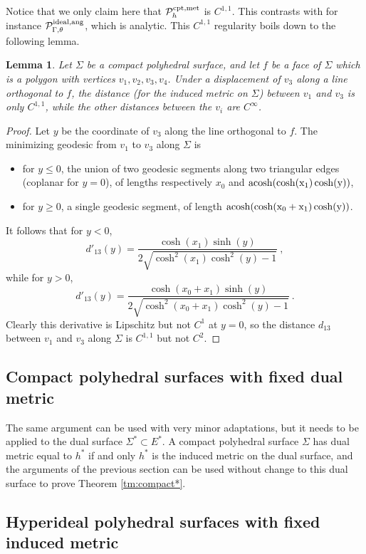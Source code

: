 \documentclass[notitlepage,twoside,a4paper]{amsart}
\newcommand{\Pidang}{\cP^{\rm ideal,ang}_{\Gamma,\theta}}
\newcommand{\Pcomet}{\cP^{\rm cpt,met}_{h}}
\newtheorem{lemma}[theorem]{\rm\bf Lemma}
\theoremstyle{named}
\newcommand{\cP}{{\mathcal P}}
\begin{document}
Notice that we only claim here that $\Pcomet$ is $C^{1,1}$. This contrasts with for instance $\Pidang$, which is analytic. This $C^{1,1}$ regularity boils down to the following lemma.

\begin{lemma} \label{lm:C11}
  Let $\Sigma$ be a compact polyhedral surface, and let $f$ be a face of $\Sigma$ which is a polygon with vertices $v_1, v_2, v_3, v_4$. Under a displacement of $v_3$ along a line orthogonal to $f$, the distance (for the induced metric on $\Sigma$) between $v_1$ and $v_3$ is only $C^{1,1}$, while the other distances between the $v_i$ are $C^{\infty}$.
\end{lemma}

\begin{proof}
  Let $y$ be the coordinate of $v_3$ along the line orthogonal to $f$. The minimizing geodesic from $v_1$ to $v_3$ along $\Sigma$ is
  \begin{itemize}
  \item for $y\leq 0$, the union of two geodesic segments along two triangular edges (coplanar for $y=0$), of lengths respectively $x_0$ and $\rm{acosh}(\cosh(x_1)\cosh(y))$,
  \item for $y\geq 0$, a single geodesic segment, of length $\rm{acosh}(\cosh(x_0+x_1)\cosh(y))$.
  \end{itemize}
  It follows that for $y<0$,
  $$ d'_{13}(y) = \frac{\cosh(x_1)\sinh(y)}{2\sqrt{\cosh^2(x_1)\cosh^2(y)-1}}~, $$
  while for $y>0$,
  $$ d'_{13}(y) = \frac{\cosh(x_0+x_1)\sinh(y)}{2\sqrt{\cosh^2(x_0+x_1)\cosh^2(y)-1}}~. $$
  Clearly this derivative is Lipschitz but not $C^1$ at $y=0$, so the distance $d_{13}$ between $v_1$ and $v_3$ along $\Sigma$ is $C^{1,1}$ but not $C^2$. 
\end{proof}

\subsection{Compact polyhedral surfaces with fixed dual metric}
\label{ssc:defo-compact*}

The same argument can be used with very minor adaptations, but it needs to be applied to the dual surface $\Sigma^*\subset E^*$. A compact polyhedral surface $\Sigma$ has dual metric equal to $h^*$ if and only $h^*$ is the induced metric on the dual surface, and the arguments of the previous section can be used without change to this dual surface to prove Theorem \ref{tm:compact*}.

\subsection{Hyperideal polyhedral surfaces with fixed induced metric}
\label{ssc:defo-hyperi}
\end{document}
